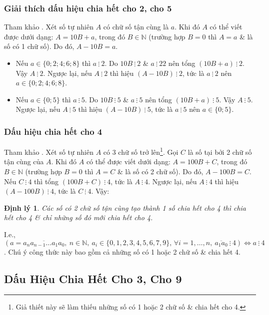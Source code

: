 \documentclass{article}
\numberwithin{equation}{section}
\newtheorem{theorem}{Định lý}[section]
\begin{document}
\subsubsection{Giải thích dấu hiệu chia hết cho 2, cho 5}
Tham khảo \cite[p. 37]{Thai_Anh_Dat_Ha_Loan_Nam_Quang_Toan_6_tap_1}. Xét số tự nhiên $A$ có chữ số tận cùng là $a$. Khi đó $A$ có thể viết được dưới dạng: $A = 10B + a$, trong đó $B\in\mathbb{N}$ (trường hợp $B = 0$ thì $A = a$ \& là số có 1 chữ số). Do đó, $A - 10 B = a$.
\begin{itemize}
	\item Nếu $a\in\{0;2;4;6;8\}$ thì $a\ \vdots\ 2$. Do $10B\ \vdots\ 2$ \& $a\ \vdots\ 2 2$ nên tổng $(10B + a)\ \vdots\ 2$. Vậy $A\ \vdots\ 2$. Ngược lại, nếu $A\ \vdots\ 2$ thì hiệu $(A - 10B)\ \vdots\ 2$, tức là $a\ \vdots\ 2$ nên $a\in\{0;2;4;6;8\}$.
	\item Nếu $a\in\{0;5\}$ thì $a\ \vdots\ 5$. Do $10B\ \vdots\ 5$ \& $a\ \vdots\ 5$ nên tổng $(10B + a)\ \vdots\ 5$. Vậy $A\ \vdots\ 5$. Ngược lại, nếu $A\ \vdots\ 5$ thì hiệu $(A - 10B)\ \vdots\ 5$, tức là $a\ \vdots\ 5$ nên $a\in\{0;5\}$.
\end{itemize}

\subsubsection{Dấu hiệu chia hết cho 4}
Tham khảo \cite[p. 37]{Thai_Anh_Dat_Ha_Loan_Nam_Quang_Toan_6_tap_1}. Xét số tự nhiên $A$ có 3 chữ số trở lên\footnote{Giả thiết này sẽ làm thiếu những số có 1 hoặc 2 chữ số \& chia hết cho 4.}. Gọi $C$ là số tại bởi 2 chữ số tận cùng của $A$. Khi đó $A$ có thể được viết dưới dạng: $A = 100B + C$, trong đó $B\in\mathbb{N}$ (trường hợp $B = 0$ thì $A = C$ \& là số có 2 chữ số). Do đó, $A - 100B = C$. Nếu $C\ \vdots\ 4$ thì tổng $(100B + C)\ \vdots\ 4$, tức là $A\ \vdots\ 4$. Ngược lại, nếu $A\ \vdots\ 4$ thì hiệu $(A - 100B)\ \vdots\ 4$, tức là $C\ \vdots\ 4$. Vậy:

\begin{theorem}
	Các số có 2 chữ số tận cùng tạo thành 1 số chia hết cho 4 thì chia hết cho 4 \& chỉ những số đó mới chia hết cho 4.
\end{theorem}
I.e., $(a = \overline{a_na_{n-1}\ldots a_1a_0},\ n\in\mathbb{N},\ a_i\in\{0,1,2,3,4,5,6,7,9\},\,\forall i = 1,\ldots,n,\ \overline{a_1a_0}\ \vdots\ 4)\Leftrightarrow a\ \vdots\ 4$. Chú ý công thức này bao gồm cả những số có 1 hoặc 2 chữ số \& chia hết 4.

\subsection{Dấu Hiệu Chia Hết Cho 3, Cho 9}
\end{document}
